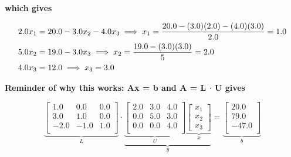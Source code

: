 \vspace*{2cm}

\textbf{\LARGE which gives}

\vspace*{2cm}

\begin{equation}
\begin{aligned}
2.0 x_1 &= 20.0 - 3.0 x_2 - 4.0 x_3 \implies x_1 = \frac{20.0 - (3.0)(2.0)-(4.0)(3.0)}{2.0} = 1.0 \bigskip\\
5.0 x_2 &= 19.0 - 3.0 x_3 \implies x_2 = \frac{19.0 - (3.0)(3.0)}{5} = 2.0 \bigskip \\
4.0 x_3 &= 12.0 \implies x_3 = 3.0
\end{aligned}
\end{equation}


\vspace*{2cm}

\textbf{\LARGE Reminder of why this works: Ax = b and A = L $\cdot$ U gives}

\begin{equation}
\underbrace{\left[
\begin{array}{rrr}
1.0 & 0.0 & 0.0 \\
3.0 & 1.0 & 0.0 \\
-2.0 & -1.0 & 1.0 \\
\end{array}
\right]}_{L} \cdot \underbrace{ \underbrace{\left[
\begin{array}{ccc}
2.0 & 3.0 & 4.0 \\
0.0 & 5.0 & 3.0 \\
0.0 & 0.0 & 4.0 \\
\end{array}
\right]}_{U} \underbrace{\left[\begin{array}{c} x_1 \\ x_2 \\x_3 \end{array}\right]}_{x}}_{y}= 
\underbrace{\left[
\begin{array}{r}
20.0 \\
79.0 \\
-47.0 \\
\end{array}
\right]}_{b}
\end{equation}




\newpage

